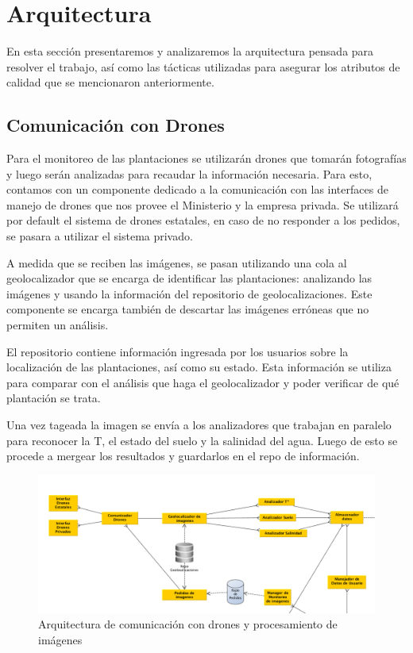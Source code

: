 \section{Arquitectura}

En esta secci\'on presentaremos y analizaremos la arquitectura pensada para resolver el trabajo, as\'i como las t\'acticas utilizadas para asegurar los atributos de calidad que se mencionaron anteriormente.

\subsection{Comunicaci\'on con Drones}

Para el monitoreo de las plantaciones se utilizar\'an drones que tomar\'an fotograf\'ias y luego ser\'an analizadas para recaudar la informaci\'on necesaria.  Para esto, contamos con un componente dedicado a la comunicaci\'on con las interfaces de manejo de drones que nos provee el Ministerio y la empresa privada. Se utilizar\'a por default el sistema de drones estatales, en caso de no responder a los pedidos, se pasara a utilizar el sistema privado.

A medida que se reciben las im\'agenes, se pasan utilizando una cola al geolocalizador que se encarga de identificar las plantaciones: analizando las im\'agenes y usando la informaci\'on del repositorio de geolocalizaciones. Este componente se encarga tambi\'en de descartar las im\'agenes err\'oneas que no permiten un an\'alisis.

El repositorio contiene informaci\'on ingresada por los usuarios sobre la localizaci\'on de las plantaciones, as\'i como su estado. Esta informaci\'on se utiliza para comparar con el an\'alisis que haga el geolocalizador y poder verificar de qu\'e plantaci\'on se trata.

Una vez tageada la imagen se env\'ia a los analizadores que trabajan en paralelo para reconocer la T\textdegree, el estado del suelo y la salinidad del agua. Luego de esto se procede a mergear los resultados y guardarlos en el repo de informaci\'on.



\begin{figure}[h!]
  \centering
  \includegraphics[width=1\textwidth]{./images/arq_drones.png}
  \caption{Arquitectura de comunicaci\'on con drones y procesamiento de im\'agenes}
  \label{fig:clases4}
\end{figure}

